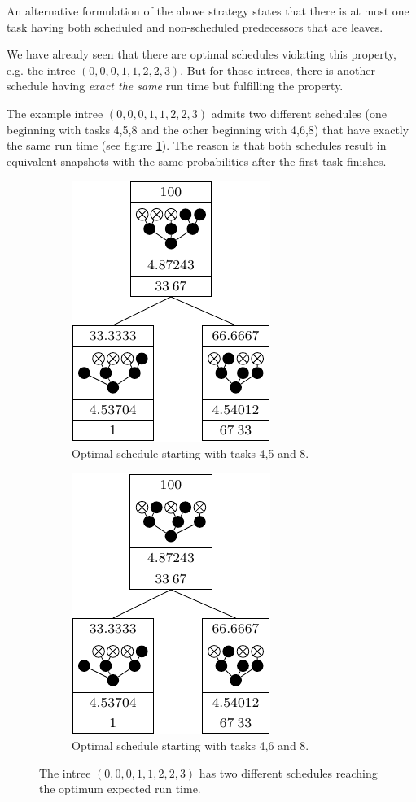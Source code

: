 An alternative formulation of the above strategy states that there is at most one task having both scheduled and non-scheduled predecessors that are leaves. 

We have already seen that there are optimal schedules violating this property, e.g. the intree $(0,0,0,1,1,2,2,3)$. But for those intrees, there is another schedule having \emph{exact the same} run time but fulfilling the property.

The example intree $(0,0,0,1,1,2,2,3)$ admits two different schedules (one beginning with tasks 4,5,8 and the other beginning with 4,6,8) that have exactly the same run time (see figure \ref{fig:filling-up-without-loss-of-generality}). The reason is that both schedules result in equivalent snapshots with the same probabilities after the first task finishes.

\begin{figure}[th]
  \centering
  \begin{subfigure}{.45\textwidth}
    \centering
    \includegraphics{p3/suboptimal/000111223_opt458.pdf}
    \caption{Optimal schedule starting with tasks 4,5 and 8.}
  \end{subfigure}
  \quad
  \begin{subfigure}{.45\textwidth}
    \centering
    \includegraphics{p3/suboptimal/000111223_opt468.pdf}
    \caption{Optimal schedule starting with tasks 4,6 and 8.}
  \end{subfigure}
  \caption{The intree $(0,0,0,1,1,2,2,3)$ has two different schedules reaching the optimum expected run time.}
  \label{fig:filling-up-without-loss-of-generality}
\end{figure}

